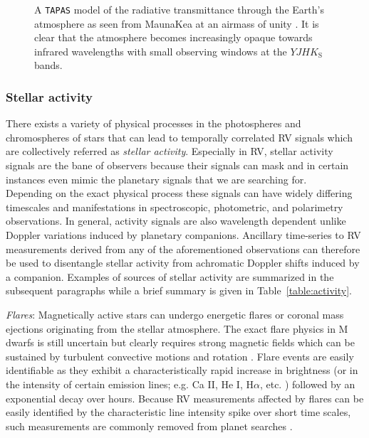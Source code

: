 \begin{figure}
  \centering
  \caption{A \texttt{TAPAS} model of the radiative transmittance through the Earth's atmosphere
    as seen from MaunaKea at an airmass of unity \citep{bertaux14}. It is clear that the atmosphere
    becomes increasingly opaque towards infrared wavelengths with small observing windows at the
    $YJHK_{\text{S}}$ bands.}
  \label{fig:transmission}
\end{figure}

\subsubsection{Stellar activity}
There exists a variety of physical processes in the photospheres and chromospheres of stars that
can lead to temporally correlated RV signals which are collectively
referred as \emph{stellar activity}. Especially in RV, stellar activity
signals are the bane of observers because their signals can mask and
in certain instances even mimic the planetary signals that we are searching for. \\

Depending on the exact physical process these
signals can have widely differing timescales and manifestations in
spectroscopic, photometric, and polarimetry observations. In general, activity
signals are also wavelength dependent unlike Doppler variations induced by
planetary companions. Ancillary time-series to RV measurements
derived from any of the aforementioned observations can therefore be used to
disentangle stellar activity from achromatic Doppler shifts induced by a companion.
Examples of sources of stellar activity are summarized in the subsequent paragraphs
while a brief summary is given in Table~\ref{table:activity}.



\emph{Flares}: Magnetically active stars can undergo energetic flares or coronal mass
ejections originating from the stellar atmosphere. The exact flare physics
in M dwarfs is still uncertain but clearly requires strong magnetic fields
which can be sustained by turbulent convective motions and rotation
\citep{browning08}. Flare events are easily identifiable as they
exhibit a characteristically rapid increase in brightness (or in the intensity
of certain emission lines; e.g. Ca II, He I, H$\alpha$, etc. \citealt{schmidt12})
followed by an exponential decay over hours. Because RV
measurements affected by flares can be easily identified by the characteristic
line intensity spike over short time scales, such measurements are commonly
removed from planet searches \citep{reiners09}. \\

